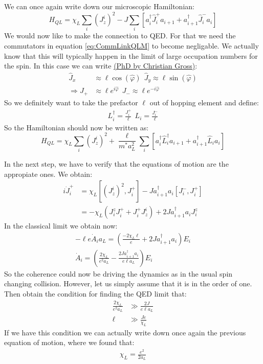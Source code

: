 \documentclass[10pt]{article}
\newcommand{\ch}{e}
\newcommand{\aL}{a_L}
\begin{document}
We can once again write down our microscopic Hamiltonian:
\begin{equation}
H_{QL} = \chi_L \sum_i (J_z^i)^2-J\sum_i \left[a_i^\dag \hat{J}^+_i a_{i+1} +a_{i+1}^\dag \hat{J}^-_i a_i \right]
\end{equation}
We would now like to make the connection to QED. For that we need the commutators in equation \eqref{eq:CommLinkQLM} to become negligable. 
 We actually know that this will typically happen in the limit of large occupation numbers for the spin. In this case we can write \href{http://www.kip.uni-heidelberg.de/Veroeffentlichungen/details.php?id=2160}{(PhD by Christian Gross)}:
\begin{eqnarray}
\hat{J}_x &\approx \ell \cos(\hat{\varphi})~~\hat{J}_y \approx \ell \sin(\hat{\varphi})\\
\Rightarrow J_+ &\approx \ell e^{i\hat{\varphi}}~~ J_- \approx \ell e^{-i\hat{\varphi}}
\end{eqnarray}
So we definitely want to take the prefactor $\ell$ out of hopping element and define:
\begin{align}
L_i^\dag = \frac{J_i^+}{\ell}~~L_i = \frac{J_i^-}{\ell}
\end{align}
So the Hamiltonian should now be written as:
\begin{equation}
H_{QL} = \chi_L \sum_i (J_z^i)^2+\frac{\ell}{m^* a_L^2}\sum_i \left[a_i^\dag \hat{L}^\dag_i a_{i+1} +a_{i+1}^\dag \hat{L}_i a_i \right]
\end{equation}

In the next step, we have to verify that the equations of motion are the appropiate ones. We obtain:
\begin{eqnarray}
i\dot{J}^+_i&=\chi_L [(J_z^i)^2, J_i^+]-Ja_{i+1}^\dag a_i [J_i^-,J_i^+]\\
&=-\chi_L (J_i^zJ_i^++J_i^+J_z^i)+2Ja_{i+1}^\dag a_i J^z_i
\end{eqnarray}
In the classical limit we obtain now:
\begin{eqnarray}
-\ell \ch\dot{A}_i \aL=  \left(\frac{-2\chi_L \ell}{\ch}+2Ja_{i+1}^\dag a_i\right)E_i\\
\dot{A}_i=  \left(\frac{2\chi_L }{\ch^2\aL}-\frac{2Ja_{i+1}^\dag a_i}{\ch\ell\aL}\right)E_i
\end{eqnarray}
So the coherence could now be driving the dynamics as in the usual spin changing collision. However, let us simply assume that it is in the order of one. Then obtain the condition for finding the QED limit that:
\begin{eqnarray}
\frac{2\chi_L }{\ch^2\aL}&\gg\frac{2J}{\ch\ell\aL}\\
\ell&\gg\frac{J\ch}{\chi_L}
\end{eqnarray}
If we have this condition we can actually write down once again the previous equation of motion, where we found that:
\begin{align}
\chi_L=\frac{\ch^2}{2\aL}
\end{align}
\end{document}
